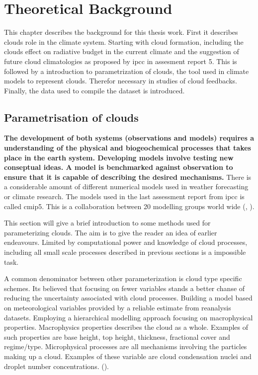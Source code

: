 \setcounter{chapter}{1} 
\chapter{Theoretical Background } \label{ch:theoretical_back}
This chapter describes the background for this thesis work. First it describes clouds role in the climate system. Starting with cloud formation, including the clouds effect on radiative budget in the current climate and the suggestion of future cloud climatologies as proposed by \acrfull{ipcc} in assesment report 5. This is followed by a introduction to parametrization of clouds, the tool used in climate models to represent clouds. Therefor necessary in studies of cloud feedbacks. %
Finally, the data used to compile the dataset is introduced. 



\section{Parametrisation of clouds} \label{sec:param_clouds}
\textbf{The development of both systems (observations and models) requires a understanding of the physical and biogeochemical processes that takes place in the earth system.
Developing models involve testing new conseptual ideas. A model is benchmarked against observation to ensure that it is capable of describing the desired mechanisms.} There is a considerable amount of different numerical models used in weather forecasting or climate research. The models used in the last assessment report from \acrshort{ipcc} is called \acrfull{cmip5}. This is a collaboration between 20 modelling groups world wide (\cite{Taylor2012AnDesign}, \cite{IPCC_CH9_climate_models}). 

This section will give a brief introduction to some methods used for parameterizing clouds. The aim is to give the reader an idea of earlier endeavours. Limited by computational power and knowledge of cloud processes, including all small scale processes described in previous sections is a impossible task. 

A common denominator between other parameterization is cloud type specific schemes. Its believed that focusing on fewer variables stands a better chanse of reducing the uncertainty associated with cloud processes. Building a model based on meteorological variables provided by a reliable estimate from reanalysis datasets. Employing a hierarchical modelling approach focusing on macrophysical properties. Macrophysics properties describes the cloud as a whole. Examples of such properties are base height, top height, thickness, fractional cover and regime/type. Microphysical processes are all mechanisms involving the particles making up a cloud. Examples of these variable are cloud condensation nuclei and droplet number concentrations. (\cite{Grabowski2019ModelingBetter}).

